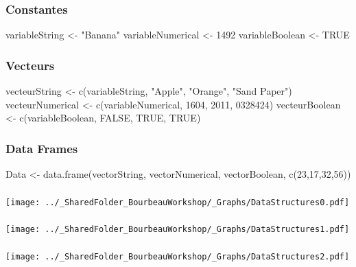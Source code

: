 \documentclass{beamer}
\begin{document}
    \begin{frame}[fragile=singleslide]
        \frametitle{Constantes}
        \begin{code}
variableString <- "Banana"
variableNumerical <- 1492
variableBoolean <- TRUE
        \end{code}
    \end{frame}
    
    \begin{frame}[fragile=singleslide]
        \frametitle{Vecteurs}
        \begin{code}
vecteurString <- c(variableString, "Apple", "Orange", "Sand Paper")
vecteurNumerical <- c(variableNumerical, 1604, 2011, 0328424)
vecteurBoolean <- c(variableBoolean, FALSE, TRUE, TRUE)
        \end{code}
    \end{frame}
    
    \begin{frame}[fragile=singleslide]
        \frametitle{Data Frames}
        \begin{code}
Data <- data.frame(vectorString, vectorNumerical, vectorBoolean, c(23,17,32,56))
        \end{code}
    \end{frame}

    \begin{frame}
        \frametitle{} \vspace{0.7cm}
        \begin{center}
            \texttt{[image: ../\_SharedFolder\_BourbeauWorkshop/\_Graphs/DataStructures0.pdf]}
        \end{center}
    \end{frame}

    \begin{frame}
        \frametitle{} \vspace{0.7cm}
        \begin{center}
            \texttt{[image: ../\_SharedFolder\_BourbeauWorkshop/\_Graphs/DataStructures1.pdf]}
        \end{center}
    \end{frame}

    \begin{frame}
        \frametitle{} \vspace{0.7cm}
        \begin{center}
            \texttt{[image: ../\_SharedFolder\_BourbeauWorkshop/\_Graphs/DataStructures2.pdf]}
        \end{center}
    \end{frame}
\end{document}
